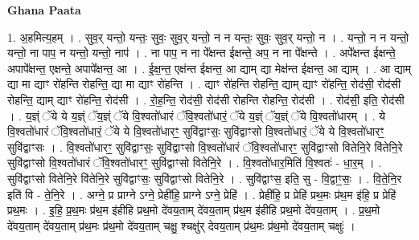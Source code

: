 \documentclass[17pt]{extarticle}
\begin{document}
\textbf{Ghana Paata } \newline

1. अ॒हमित्य॒हम् । . सुव॒र् यन्तो॒ यन्तः॒ सुवः॒ सुव॒र् यन्तो॒ न न यन्तः॒ सुवः॒ सुव॒र् यन्तो॒ न । . यन्तो॒ न न यन्तो॒ यन्तो॒ ना पाप॒ न यन्तो॒ यन्तो॒ नाप॑ । . ना पाप॒ न ना पे᳚क्षन्त ईक्षन्ते॒ अप॒ न ना पे᳚क्षन्ते । . अपे᳚क्षन्त ईक्षन्ते॒ अपापे᳚क्षन्त॒ एक्षन्ते॒ अपापे᳚क्षन्त॒ आ । . ई॒क्ष॒न्त॒ एक्ष॑न्त ईक्षन्त॒ आ द्याम् द्या मेक्ष॑न्त ईक्षन्त॒ आ द्याम् । . आ द्याम् द्या मा द्याꣳ रो॑हन्ति रोहन्ति॒ द्या मा द्याꣳ रो॑हन्ति । . द्याꣳ रो॑हन्ति रोहन्ति॒ द्याम् द्याꣳ रो॑हन्ति॒ रोद॑सी॒ रोद॑सी रोहन्ति॒ द्याम् द्याꣳ रो॑हन्ति॒ रोद॑सी । . रो॒ह॒न्ति॒ रोद॑सी॒ रोद॑सी रोहन्ति रोहन्ति॒ रोद॑सी । . रोद॑सी॒ इति॒ रोद॑सी । . य॒ज्ञ्ं ॅये ये य॒ज्ञ्ं ॅय॒ज्ञ्ं ॅये वि॒श्वतो॑धारं ॅवि॒श्वतो॑धारं॒ ॅये य॒ज्ञ्ं ॅय॒ज्ञ्ं ॅये वि॒श्वतो॑धारम् । . ये वि॒श्वतो॑धारं ॅवि॒श्वतो॑धारं॒ ॅये ये वि॒श्वतो॑धारꣳ॒॒ सुवि॑द्वाꣳसः॒ सुवि॑द्वाꣳसो वि॒श्वतो॑धारं॒ ॅये ये वि॒श्वतो॑धारꣳ॒॒ सुवि॑द्वाꣳसः । . वि॒श्वतो॑धारꣳ॒॒ सुवि॑द्वाꣳसः॒ सुवि॑द्वाꣳसो वि॒श्वतो॑धारं ॅवि॒श्वतो॑धारꣳ॒॒ सुवि॑द्वाꣳसो वितेनि॒रे वि॑तेनि॒रे सुवि॑द्वाꣳसो वि॒श्वतो॑धारं ॅवि॒श्वतो॑धारꣳ॒॒ सुवि॑द्वाꣳसो वितेनि॒रे । . वि॒श्वतो॑धार॒मिति॑ वि॒श्वतः॑ - धा॒र॒म् । . सुवि॑द्वाꣳसो वितेनि॒रे वि॑तेनि॒रे सुवि॑द्वाꣳसः॒ सुवि॑द्वाꣳसो वितेनि॒रे । . सुवि॑द्वाꣳस॒ इति॒ सु - वि॒द्वाꣳ॒॒सः॒ । . वि॒ते॒नि॒र इति॑ वि - ते॒नि॒रे । . अग्ने॒ प्र प्राग्ने ऽग्ने॒ प्रेही॑हि॒ प्राग्ने ऽग्ने॒ प्रेहि॑ । . प्रेही॑हि॒ प्र प्रेहि॑ प्रथ॒मः प्र॑थ॒म इ॑हि॒ प्र प्रेहि॑ प्रथ॒मः । . इ॒हि॒ प्र॒थ॒मः प्र॑थ॒म इ॑हीहि प्रथ॒मो दे॑वय॒ताम् दे॑वय॒ताम् प्र॑थ॒म इ॑हीहि प्रथ॒मो दे॑वय॒ताम् । . प्र॒थ॒मो दे॑वय॒ताम् दे॑वय॒ताम् प्र॑थ॒मः प्र॑थ॒मो दे॑वय॒ताम् चक्षु॒ श्चक्षु॑र् देवय॒ताम् प्र॑थ॒मः प्र॑थ॒मो दे॑वय॒ताम् चक्षुः॑ । \newline
\end{document}
